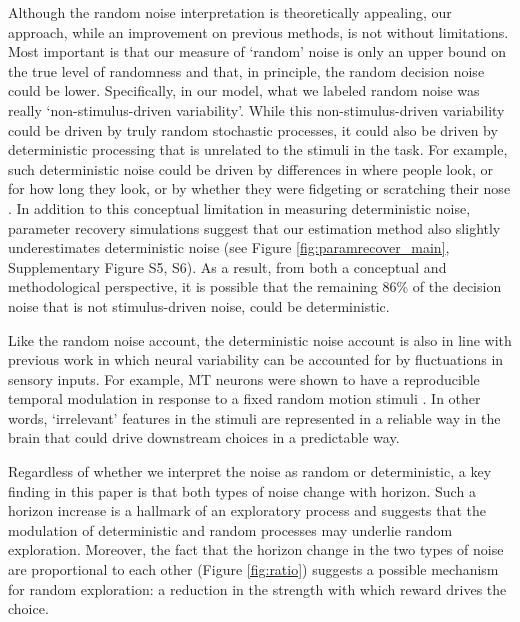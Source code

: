 \documentclass[12pt]{article}
\begin{document}
{Although the random noise interpretation is theoretically appealing, our approach, while an improvement on previous methods, is not without limitations. Most important is that our measure of `random' noise is only an upper bound on the true level of randomness and that, in principle, the random decision noise could be lower. Specifically, in our model, what we labeled random noise was really `non-stimulus-driven variability'. While this non-stimulus-driven variability could be driven by truly random stochastic processes, it could also be driven by deterministic processing that is unrelated to the stimuli in the task. For example, such deterministic noise could be driven by differences in where people look, or for how long they look, or by whether they were fidgeting or scratching their nose \citep{Musall2019}. In addition to this conceptual limitation in measuring deterministic noise, parameter recovery simulations suggest that our estimation method also slightly underestimates deterministic noise (see Figure \ref{fig:paramrecover_main}, Supplementary Figure S5, S6). As a result, from both a conceptual and methodological perspective, it is possible that the remaining 86\% of the decision noise that is not stimulus-driven noise, could be deterministic.

Like the random noise account, the deterministic noise account is also in line with previous work in which neural variability can be accounted for by fluctuations in sensory inputs. For example, MT neurons were shown to have a reproducible temporal modulation in response to a fixed random motion stimuli \citep{Bair1996}. In other words, `irrelevant' features in the stimuli are represented in a reliable way in the brain that could drive downstream choices in a predictable way. 


Regardless of whether we interpret the noise as random or deterministic, a key finding in this paper is that both types of noise change with horizon. Such a horizon increase is a hallmark of an exploratory process and suggests that the modulation of deterministic and random processes may underlie random exploration. Moreover, the fact that the horizon change in the two types of noise are proportional to each other (Figure \ref{fig:ratio}) suggests a possible mechanism for random exploration: a reduction in the strength with which reward drives the choice. 

}
\end{document}
